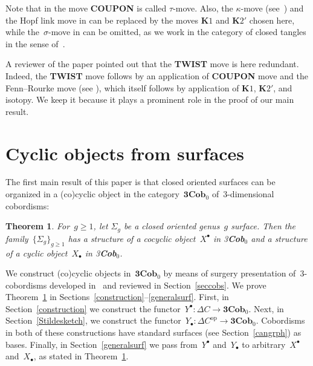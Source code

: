 \documentclass[10pt,a4paper]{amsart}
\numberwithin{equation}{section}
\newtheorem{Theorem}{Theorem}[section]
\newcommand{\co}{\colon}
\newcommand{\opp}{\mathrm{op}}
\newcommand{\Cob}{\textbf{Cob}}
\begin{document}
Note that in \cite[Theorem~3]{kerler-bridged-links} the move \textbf{COUPON} is called $\tau$-move. Also, the $\kappa$-move (see~\cite{Fenn-Rourke}) and the Hopf link move in \cite{kerler-bridged-links} can be replaced by the moves $\textbf{K}1$ and $\textbf{K}2'$ chosen here, while the~$\sigma$-move in \cite{kerler-bridged-links} can be omitted, as we work in the category of closed tangles in the sense of~\cite[Section~3.2.4]{kerler-bridged-links}.

\begin{Remark} A reviewer of the paper pointed out that the \textbf{TWIST} move is here redundant.
Indeed, the \textbf{TWIST} move follows by an application of \textbf{COUPON} move and the Fenn--Rourke move (see \cite{Fenn-Rourke}), which itself follows by application of $\textbf{K}1$, $\textbf{K}2'$, and isotopy. We keep it because it plays a prominent role in the proof of our main result.
\end{Remark}


\section{Cyclic objects from surfaces}\label{cobcyclic}
The first main result of this paper is that closed oriented surfaces can be organized in a (co)cyclic object in the category~$\textbf{3}\Cob_0$ of~$3$-dimensional cobordisms:


\begin{Theorem} \label{CYCINCOB}
For~$g\geq 1$, let $\Sigma_g$ be a closed oriented genus~$g$ surface. Then the fa\-mily~$\{\Sigma_g\}_{g\ge 1}$ has a structure of a cocyclic object~$X^\bullet$ in \emph{3\Cob}$_0$ and a structure of a cyclic object~$X_\bullet$ in \emph{3\Cob}$_0$.
\end{Theorem}
We construct (co)cyclic objects in~$\textbf{3}\Cob_0$ by means of surgery presentation of~$3$-cobordisms developed in~\cite{reshetikhin_invariants_1991, turaevqinvariants} and reviewed in Section~\ref{seccobs}.
We prove Theorem~\ref{CYCINCOB} in Sections~{\ref{construction}--\ref{generalsurf}}.
First, in Section~\ref{construction} we construct the functor~$Y^\bullet \co \Delta C\to \textbf{3}\Cob_0$.
Next, in Section~\ref{Stildesketch}, we construct the functor~$Y_{\bullet}\co \Delta C^{\opp}\to \textbf{3}\Cob_0$.
Cobordisms in both of these constructions have standard surfaces (see Section~\ref{cangrph}) as bases.
Finally, in Section~\ref{generalsurf} we pass from~$Y^\bullet$ and~$Y_\bullet$ to arbitrary~$X^\bullet$ and~$X_\bullet$, as stated in Theorem~\ref{CYCINCOB}.
\end{document}

